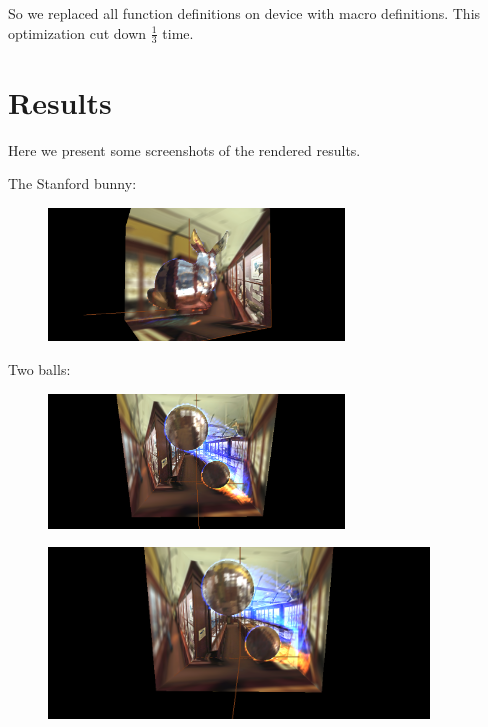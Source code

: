 \documentclass[a4paper]{article}
\begin{document}
\begin{CJK*}{UTF8}{gkai}
So we replaced all function definitions on device with macro definitions. This optimization cut down $\frac{1}{3}$ time.


\section{Results}
Here we present some screenshots of the rendered results.

The Stanford bunny:
\begin{figure}[H]
\centering
\includegraphics[width=0.7\textwidth]{bunnyres.png}
\caption{\label{fig:bunnyres}}
\end{figure}

Two balls:
\begin{figure}[H]
\centering
\includegraphics[width=0.7\textwidth]{ball1.png}
\caption{\label{fig:ball1}}
\end{figure}



\begin{figure}[H]
\centering
\includegraphics[width=0.9\textwidth]{ball2.png}
\caption{\label{fig:ball2}}
\end{figure}


\end{CJK*}
\end{document}
